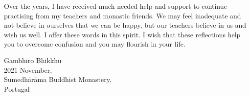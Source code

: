 Over the years, I have received much needed help and support to continue
practising from my teachers and monastic friends. We may feel inadequate
and not believe in ourselves that we can be happy, but our teachers
believe in us and wish us well. I offer these words in this spirit. I
wish that these reflections help you to overcome confusion and you may
flourish in your life.

\bigskip

\enlargethispage*{\baselineskip}

{\raggedleft
Gambhīro Bhikkhu\\
2021 November,\\
Sumedhārāma Buddhist Monastery,\\
Portugal
\par}
